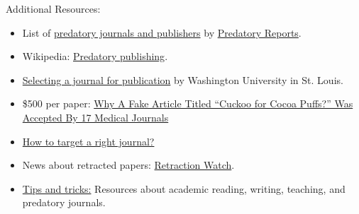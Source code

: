 \documentclass[11pt]{beamer}
\begin{document}
\begin{frame}{Additional Resources:}
	\begin{itemize} 
	\item List of {\color{blue}\href{https://predatoryreports.org/the-list}{predatory journals and publishers}} by {\color{blue}\href{https://predatoryreports.org/home}{Predatory Reports}}.
    \item Wikipedia: {\color{blue}\href{https://en.wikipedia.org/wiki/Predatory_publishing}{Predatory publishing}}.
    \item {\color{blue}\href{https://beckerguides.wustl.edu/selectingjournal}{Selecting a journal for publication}} by Washington University in St. Louis.
    \item \$500 per paper: {\color{blue}\href{https://www.fastcompany.com/3041493/why-a-fake-article-cuckoo-for-cocoa-puffs-was-accepted-by-17-medical-journals}{Why A Fake Article Titled “Cuckoo for Cocoa Puffs?” Was Accepted By 17 Medical Journals}}
    \item {\color{blue}\href{https://www.scidev.net/global/practical-guides/target-journal-right-research-communicate-publish}{How to target a right journal?}}
    \item News about retracted papers: {\color{blue}\href{https://retractionwatch.com/}{Retraction Watch}}.
    \item {\color{blue}\href{https://bijeshmishra.com/career-development/}{Tips and tricks:}} Resources about academic reading, writing, teaching, and predatory journals.
	\end{itemize}
\end{frame}

\end{document}
